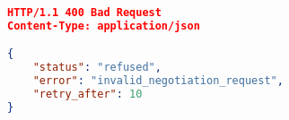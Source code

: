 

\begin{lstlisting}[language=json,firstnumber=1]
HTTP/1.1 400 Bad Request
Content-Type: application/json

{
    "status": "refused",
    "error": "invalid_negotiation_request",
    "retry_after": 10
}

\end{lstlisting}